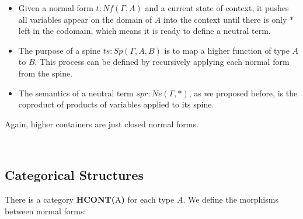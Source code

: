 \begin{itemize}
  \item{Given a normal form $t : Nf(\Gamma,A)$ and a current state of context, it pushes all variables appear on the domain of $A$ into the context until there is only $*$ left in the codomain, which means it is ready to define a neutral term.}

  \item{The purpose of a spine $ts : Sp(\Gamma,A,B)$ is to map a higher function of type $A$ to $B$. This process can be defined by recursively applying each normal form from the spine.}

  \item{The semantics of a neutral term $spr : Ne(\Gamma,*)$, as we proposed before, is the coproduct of products of variables applied to its spine.}
\end{itemize}

Again, higher containers are just closed normal forms.

\begin{code}%
\>[0]\AgdaSpace{}%
\AgdaSymbol{:}\AgdaSpace{}%
\AgdaSpace{}%
\AgdaSpace{}%
\AgdaSpace{}%
\AgdaSpace{}%
\AgdaSpace{}%
\<%
\\
\>[0]\AgdaSpace{}%
\AgdaSpace{}%
\AgdaSpace{}%
\AgdaSymbol{=}\AgdaSpace{}%
\AgdaSpace{}%
\AgdaSpace{}%
\AgdaSpace{}%
\AgdaSymbol{(}\AgdaSpace{}%
\AgdaSymbol{)}\<%
\end{code}

\subsection{Categorical Structures}

There is a category \textbf{HCONT(}A\textbf{)} for each type $A$. We define the morphisms between normal forms:

\begin{code}[hide]%
\>[0]\<%
\end{code}

